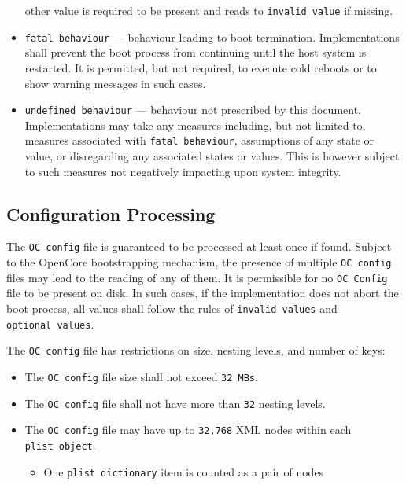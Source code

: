 \documentclass[]{article}
\providecommand{\tightlist}{%
  \setlength{\itemsep}{0pt}\setlength{\parskip}{0pt}}
\begin{document}
\begin{itemize}
  other value is required to be present and reads to
  \texttt{invalid\ value} if missing.
\item
  \texttt{fatal\ behaviour} --- behaviour leading to boot termination.
  Implementations shall prevent the boot process from continuing until
  the host system is restarted. It is permitted, but not required, to
  execute cold reboots or to show warning messages in such cases.
\item
  \texttt{undefined\ behaviour} --- behaviour not prescribed by this
  document. Implementations may take any measures including, but not
  limited to, measures associated with \texttt{fatal\ behaviour}, assumptions
  of any state or value, or disregarding any associated states or values. This is
  however subject to such measures not negatively impacting upon system integrity.
\end{itemize}

\subsection{Configuration Processing}\label{configuration-processing}

The \texttt{OC\ config} file is guaranteed to be processed at least once if found.
Subject to the OpenCore bootstrapping mechanism, the presence of multiple
\texttt{OC\ config} files may lead to the reading of any of them. It is
permissible for no \texttt{OC\ Config} file to be present on disk. In such cases,
if the implementation does not abort the boot process, all values shall follow the
rules of \texttt{invalid\ values} and \texttt{optional\ values}.

The \texttt{OC\ config} file has restrictions on size, nesting levels, and number of keys:

\begin{itemize}
\tightlist
\item
  The \texttt{OC\ config} file size shall not exceed \texttt{32\ MBs}.
\item
  The \texttt{OC\ config} file shall not have more than \texttt{32} nesting levels.
\item
  The \texttt{OC\ config} file may have up to \texttt{32,768} XML nodes within
  each \texttt{plist\ object}.
  \begin{itemize}
  \tightlist
    \item One \texttt{plist\ dictionary} item is counted as a pair of nodes
  \end{itemize} \medskip
\end{itemize}
\end{document}
